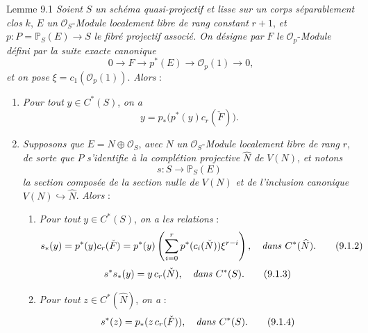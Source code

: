 \begin{statement}{Lemme 9.1}
\emph{Soient} $S$ \emph{un schéma quasi-projectif et lisse sur un corps séparablement clos} $k$, $E$ \emph{un} $\mathcal{O}_S$-\emph{Module localement libre de rang constant} $r+1$, \emph{et} $p:P=\mathbb{P}_S(E)\to S$ \emph{le fibré projectif associé. On désigne par} $F$ \emph{le} $\mathcal{O}_p$-\emph{Module défini par la suite exacte canonique}
\[
0\to F\to p^*(E)\to\mathcal{O}_p(1)\to0,
\tag{9.1.0}
\]
\emph{et on pose} $\xi=c_1(\mathcal{O}_p(1))$. \emph{Alors} :
\begin{enumerate}[label=(\roman*)]
\item \emph{Pour tout} $y\in C^*(S)$, \emph{on a}
\[
y=p_*\bigl(p^*(y)c_r(\check F)\bigr).
\tag{9.1.1}
\]
\item \emph{Supposons que} $E=N\oplus\mathcal{O}_S$, \emph{avec} $N$ \emph{un} $\mathcal{O}_S$-\emph{Module localement libre de rang} $r$, \emph{de sorte que} $P$ \emph{s'identifie à la complétion projective} $\widehat N$ \emph{de} $V(N)$, \emph{et notons}
\[
s:S\to\mathbb{P}_S(E)
\]
\emph{la section composée de la section nulle de} $V(N)$ \emph{et de l'inclusion canonique} $V(N)\hookrightarrow\widehat N$. \emph{Alors} :
\begin{enumerate}[label=(\alph*)]
\item \emph{Pour tout} $y\in C^*(S)$, \emph{on a les relations} :
\[
s_*(y)=p^*(y)c_r(\check F)=p^*(y)\left(\sum_{i=0}^r p^*(c_i(\check N))\xi^{r-i}\right),
\quad\text{\emph{dans} }C^*(\widehat N).
\tag{9.1.2}
\]
\[
s^*s_*(y)=y\,c_r(\check N),\quad\text{\emph{dans} }C^*(S).
\tag{9.1.3}
\]
\item
\emph{Pour tout} $z\in C^*(\widehat N)$, \emph{on a} :
\[
s^*(z)=p_*(z\,c_r(\check F)),\quad\text{\emph{dans} }C^*(S).
\tag{9.1.4}
\]
\end{enumerate}
\end{enumerate}
\end{statement}

